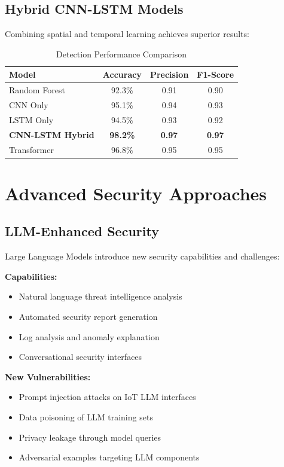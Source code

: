 \documentclass[12pt,a4paper]{article}
\begin{document}
\subsection{Hybrid CNN-LSTM Models}

Combining spatial and temporal learning achieves superior results:

\begin{table}[H]
\centering
\caption{Detection Performance Comparison}
\begin{tabular}{lccc}
\toprule
\textbf{Model} & \textbf{Accuracy} & \textbf{Precision} & \textbf{F1-Score} \\
\midrule
Random Forest & 92.3\% & 0.91 & 0.90 \\
CNN Only & 95.1\% & 0.94 & 0.93 \\
LSTM Only & 94.5\% & 0.93 & 0.92 \\
\textbf{CNN-LSTM Hybrid} & \textbf{98.2\%} & \textbf{0.97} & \textbf{0.97} \\
Transformer & 96.8\% & 0.95 & 0.95 \\
\bottomrule
\end{tabular}
\end{table}

\section{Advanced Security Approaches}

\subsection{LLM-Enhanced Security}

Large Language Models introduce new security capabilities and challenges:

\textbf{Capabilities:}
\begin{itemize}
    \item Natural language threat intelligence analysis
    \item Automated security report generation
    \item Log analysis and anomaly explanation
    \item Conversational security interfaces
\end{itemize}

\textbf{New Vulnerabilities:}
\begin{itemize}
    \item Prompt injection attacks on IoT LLM interfaces
    \item Data poisoning of LLM training sets
    \item Privacy leakage through model queries
    \item Adversarial examples targeting LLM components
\end{itemize}
\end{document}
